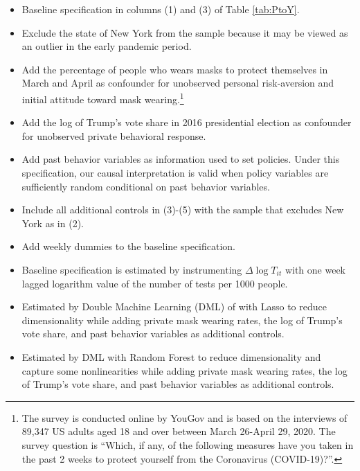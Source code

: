\documentclass[11pt,reqno,letter]{amsart}
\theoremstyle{definition}
\begin{document}
  \begin{itemize}
  \item[(1)] Baseline specification  in columns (1) and (3) of Table  \ref{tab:PtoY}.
  \item[(2)]  Exclude  the state of New York from the sample because it may be viewed as an outlier in the early pandemic period.
  \item[(3)]   Add  the percentage of people who wears masks to protect themselves in March and April as confounder for unobserved  personal risk-aversion and initial attitude toward mask wearing.\footnote{ The survey is conducted online by YouGov and is based on the interviews of 89,347 US adults aged 18 and over between March 26-April 29, 2020.  The survey question is ``Which, if any, of the following measures have you taken in the past 2 weeks to protect yourself from the Coronavirus (COVID-19)?''.}
   \item[(4)]   Add the log of Trump's vote share  in 2016 presidential election as confounder for unobserved private behavioral response.
   \item[(5)]   Add  past behavior variables  as information used to set policies. Under this specification, our causal interpretation is valid when policy variables are sufficiently random conditional on past behavior variables.
   \item[(6)]   Include all additional controls in (3)-(5) with the sample that excludes New York as in (2).
   \item[(7)] Add weekly dummies  to the baseline specification.
   \item[(8)] Baseline specification is estimated by instrumenting $\Delta \log T_{it}$ with one week lagged  logarithm  value of the number of tests per 1000 people.
   \item[(9)]   Estimated by Double Machine Learning (DML) of \cite{chernozhukov18} with Lasso to reduce dimensionality while adding private mask wearing rates,  the log of Trump's vote share, and  past behavior variables  as additional controls.   \item[(10)]  Estimated by DML with Random Forest to reduce dimensionality  and capture some nonlinearities while adding private mask wearing rates,  the log of Trump's vote share, and  past behavior variables as additional controls.
  \end{itemize}
\end{document}

